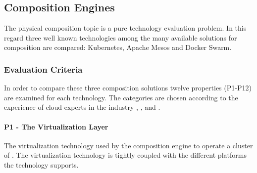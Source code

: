 \newpage
\subsection{Composition Engines}
\label{sub:composition_engines}

The physical \ms{} composition topic is a pure technology evaluation problem.
In this regard three well known technologies among the many available solutions 
for \ms{} composition are compared: Kubernetes, Apache Mesos and Docker Swarm.

\subsubsection{Evaluation Criteria}

In order to compare these three composition solutions twelve properties
(P1-P12) are examined for each technology. The categories are chosen according
to the experience of cloud experts in the industry
\cite{toll2016cloud_expert_eval}, \cite{lerilli2012cloud_eval_criteria}, and
\cite{voras2011evaluating}.


\paragraph{P1 - The Virtualization Layer}

The virtualization technology used by the composition engine to operate a
cluster of \mss{}. The virtualization technology is tightly coupled with the
different platforms the technology supports.

